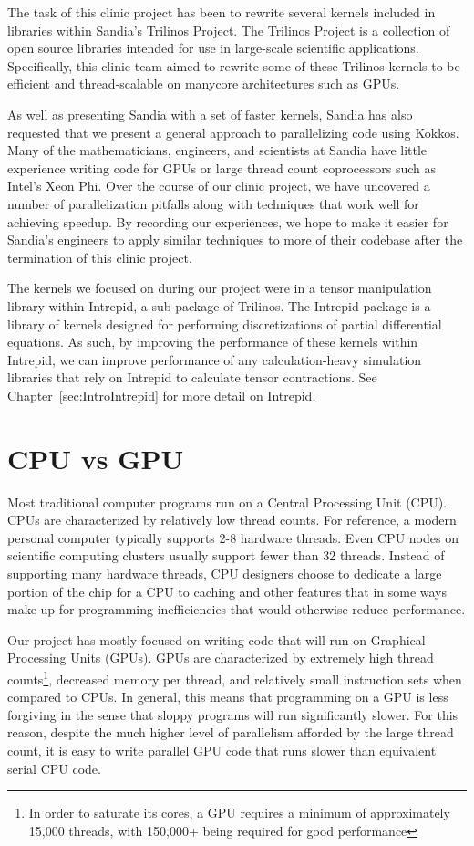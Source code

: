The task of this clinic project has been to rewrite several kernels included in
libraries within Sandia's Trilinos Project. The Trilinos Project is a
collection of open source libraries intended for use in large-scale scientific
applications. Specifically, this clinic team aimed to rewrite some of these Trilinos kernels to be
efficient and thread-scalable on manycore architectures such as GPUs.

As well as presenting Sandia with a set of faster kernels, Sandia has also
requested that we present a general approach to parallelizing code using Kokkos. Many of the
mathematicians, engineers, and scientists at Sandia have little experience
writing code for GPUs or large thread count coprocessors such as Intel's Xeon Phi. Over
the course of our clinic project, we have uncovered a number of parallelization pitfalls 
along with techniques that work well for achieving speedup. By recording our experiences, we hope to
make it easier for Sandia's engineers to apply similar techniques to more of
their codebase after the termination of this clinic project.

The kernels we focused on during our project were in a tensor manipulation
library within Intrepid, a sub-package of Trilinos. The Intrepid package is a
library of kernels designed for performing discretizations of partial
differential equations. As such, by improving the performance of these kernels
within Intrepid, we can improve performance of any calculation-heavy simulation
libraries that rely on Intrepid to calculate tensor contractions. See
Chapter~\ref{sec:IntroIntrepid} for more detail on Intrepid.

\section{CPU vs GPU} \label{CPU-GPU}

Most traditional computer programs run on a Central Processing Unit (CPU). CPUs
are characterized by relatively low thread counts. For reference, a modern personal computer
typically supports 2-8 hardware threads. Even CPU nodes on scientific computing clusters usually
support fewer than 32 threads. Instead of supporting many hardware threads, CPU designers 
choose to dedicate a large portion of the chip for a CPU to
caching and other features that in some ways make up for
programming inefficiencies that would otherwise reduce performance.

Our project has mostly focused on writing code that will run on Graphical
Processing Units (GPUs). GPUs are characterized by extremely high thread counts\footnote{
In order to saturate its cores, a GPU requires a minimum of approximately 15,000 threads, 
with 150,000+ being required for good performance},
decreased memory per thread, and relatively small instruction sets when compared
to CPUs. In general, this means that programming on a GPU is less forgiving in the 
sense that sloppy programs will run significantly slower. For this reason,
despite the much higher level of parallelism afforded by the large thread
count, it is easy to write parallel GPU code that runs slower than
equivalent serial CPU code.

